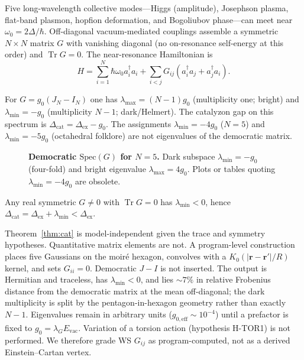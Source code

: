 \documentclass[11pt,letterpaper]{article}
\begin{document}
Five long-wavelength collective modes---Higgs (amplitude), Josephson plasma, flat-band plasmon, hopfion deformation, and Bogoliubov phase---can meet near $\omega_0=2\Delta/\hbar$. Off-diagonal vacuum-mediated couplings assemble a symmetric $N\times N$ matrix $G$ with vanishing diagonal (no on-resonance self-energy at this order) and $\operatorname{Tr} G=0$. The near-resonance Hamiltonian is
\begin{equation}
H=\sum_{i=1}^N\hbar\omega_0 a_i^\dagger a_i+\sum_{i<j}G_{ij}(a_i^\dagger a_j+a_j^\dagger a_i).
\end{equation}

\begin{theorem}
\label{thm:demo}
For $G=g_0(J_N-I_N)$ one has $\lambda_{\max}=(N-1)g_0$ (multiplicity one; bright) and $\lambda_{\min}=-g_0$ (multiplicity $N-1$; dark/Helmert). The catalyzon gap on this spectrum is $\Delta_{\mathrm{cat}}=\Delta_{\mathrm{ex}}-g_0$. The assignments $\lambda_{\min}=-4g_0$ ($N=5$) and $\lambda_{\min}=-5g_0$ (octahedral folklore) are not eigenvalues of the democratic matrix.
\end{theorem}

\begin{figure}[H]
\centering

\caption{\textbf{Democratic $\mathrm{Spec}(G)$ for $N=5$.} Dark subspace $\lambda_{\min}=-g_0$ (four-fold) and bright eigenvalue $\lambda_{\max}=4g_0$. Plots or tables quoting $\lambda_{\min}=-4g_0$ are obsolete.}
\label{fig:spec}
\end{figure}

\begin{theorem}
\label{thm:cat}
Any real symmetric $G\neq 0$ with $\operatorname{Tr} G=0$ has $\lambda_{\min}<0$, hence $\Delta_{\mathrm{cat}}=\Delta_{\mathrm{ex}}+\lambda_{\min}<\Delta_{\mathrm{ex}}$.
\end{theorem}

Theorem~\ref{thm:cat} is model-independent given the trace and symmetry hypotheses. Quantitative matrix elements are not. A program-level construction places five Gaussians on the moir\'e hexagon, convolves with a $K_0(|\mathbf{r}-\mathbf{r}'|/R)$ kernel, and sets $G_{ii}=0$. Democratic $J-I$ is not inserted. The output is Hermitian and traceless, has $\lambda_{\min}<0$, and lies $\sim 7\%$ in relative Frobenius distance from the democratic matrix at the mean off-diagonal; the dark multiplicity is split by the pentagon-in-hexagon geometry rather than exactly $N-1$. Eigenvalues remain in arbitrary units ($g_{0,\mathrm{eff}}\sim 10^{-4}$) until a prefactor is fixed to $g_0=\lambda_G E_{\mathrm{vac}}$. Variation of a torsion action (hypothesis H-TOR1) is not performed. We therefore grade WS $G_{ij}$ as program-computed, not as a derived Einstein--Cartan vertex.
\end{document}
